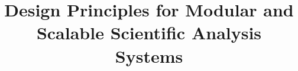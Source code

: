 \documentclass{acm_proc_article-sp}
\begin{document}
\title{Design Principles for Modular and Scalable \linebreak Scientific Analysis Systems}
%
%
%
%
%

%
\author{}
%
%


\maketitle
\end{document}
